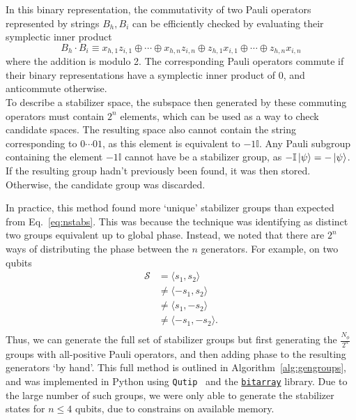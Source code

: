 \documentclass{standalone}
\begin{document}
In this binary representation, the commutativity of two Pauli operators represented by strings $B_{h},B_{i}$ can be efficiently checked by evaluating their symplectic inner product~\cite{Aaronson2004a}
\begin{equation}\label{eq:sympprod}
    B_{h}\cdot B_{i} \equiv x_{h,1}z_{i,1}\oplus\cdots\oplus x_{h,n}z_{i,n}\oplus z_{h,1}x_{i,1}\oplus\cdots\oplus z_{h,n}x_{i,n}
\end{equation}
where the addition is modulo 2. The corresponding Pauli operators commute if their binary representations have a symplectic inner product of $0$, and anticommute otherwise.\\
To describe a stabilizer space, the subspace then generated by these commuting operators must contain $2^{n}$ elements, which can be used as a way to check candidate spaces. The resulting space also cannot contain the string corresponding to $0\cdots01$, as this element is equivalent to $-1\mathbb{I}$. Any Pauli subgroup containing the element $-1\mathbb{I}$ cannot have be a stabilizer group, as $-\mathbb{I}\ket{\psi}=-\ket{\psi}$. \\
If the resulting group hadn't previously been found, it was then stored. Otherwise, the candidate group was discarded.
\par
In practice, this method found more `unique' stabilizer groups than expected from Eq.~\ref{eq:nstabs}. This was because the technique was identifying as distinct two groups equivalent up to global phase. Instead, we noted that there are $2^{n}$ ways of distributing the phase between the $n$ generators. For example, on two qubits
\begin{align*}
    \mathcal{S}&=\langle s_{1},s_{2}\rangle \\
    &\neq \langle -s_{1},s_{2}\rangle \\
    &\neq \langle s_{1},-s_{2}\rangle \\
    &\neq \langle -s_{1},-s_{2}\rangle. \\
\end{align*}
Thus, we can generate the full set of stabilizer groups but first generating the $\frac{N_{\phi}}{2^{n}}$ groups with all-positive Pauli operators, and then adding phase to the resulting generators `by hand'. This full method is outlined in Algorithm~\ref{alg:gengroups}, and was implemented in Python using \texttt{Qutip}~\cite{Johansson2012} and the \href{https://github.com/ilanschnell/bitarray}{\texttt{bitarray}} library. Due to the large number of such groups, we were only able to generate the stabilizer states for $n\leq 4$ qubits, due to constrains on available memory.
\end{document}
